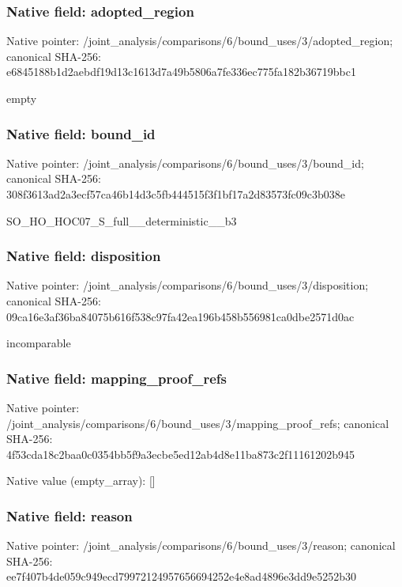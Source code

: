 \documentclass[10pt,a4paper]{article}
\begin{document}
\subsubsection{Native field: adopted\_\allowbreak{}region}
Native pointer: /joint\_\allowbreak{}analysis/comparisons/6/bound\_\allowbreak{}uses/3/adopted\_\allowbreak{}region; canonical SHA-256: e6845188b1d2aebdf19d13c1613d7a49b5806a7fe336ec775fa182b36719bbc1

\begingroup\raggedright\sloppy empty\par\endgroup

\subsubsection{Native field: bound\_\allowbreak{}id}
Native pointer: /joint\_\allowbreak{}analysis/comparisons/6/bound\_\allowbreak{}uses/3/bound\_\allowbreak{}id; canonical SHA-256: 308f3613ad2a3ecf57ca46b14d3c5fb444515f3f1bf17a2d83573fc09c3b038e

\begingroup\raggedright\sloppy SO\_\allowbreak{}HO\_\allowbreak{}HOC07\_\allowbreak{}S\_\allowbreak{}full\_\allowbreak{}\_\allowbreak{}deterministic\_\allowbreak{}\_\allowbreak{}b3\par\endgroup

\subsubsection{Native field: disposition}
Native pointer: /joint\_\allowbreak{}analysis/comparisons/6/bound\_\allowbreak{}uses/3/disposition; canonical SHA-256: 09ca16e3af36ba84075b616f538c97fa42ea196b458b556981ca0dbe2571d0ac

\begingroup\raggedright\sloppy incomparable\par\endgroup

\subsubsection{Native field: mapping\_\allowbreak{}proof\_\allowbreak{}refs}
Native pointer: /joint\_\allowbreak{}analysis/comparisons/6/bound\_\allowbreak{}uses/3/mapping\_\allowbreak{}proof\_\allowbreak{}refs; canonical SHA-256: 4f53cda18c2baa0c0354bb5f9a3ecbe5ed12ab4d8e11ba873c2f11161202b945

Native value (empty\_\allowbreak{}array): []

\subsubsection{Native field: reason}
Native pointer: /joint\_\allowbreak{}analysis/comparisons/6/bound\_\allowbreak{}uses/3/reason; canonical SHA-256: ee7f407b4de059c949ecd79972124957656694252e4e8ad4896e3dd9e5252b30
\end{document}
